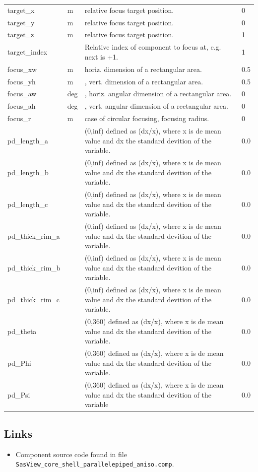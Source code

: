 \begin{longtable}{p{}p{}p{}p{}}
target\_x & m & relative focus target position. & 0 \\
target\_y & m & relative focus target position. & 0 \\
target\_z & m & relative focus target position. & 1 \\
target\_index &   & Relative index of component to focus at, e.g. next is +1. & 1 \\
focus\_xw & m & horiz. dimension of a rectangular area. & 0.5 \\
focus\_yh & m & , vert. dimension of a rectangular area. & 0.5 \\
focus\_aw & deg & , horiz. angular dimension of a rectangular area. & 0 \\
focus\_ah & deg & , vert. angular dimension of a rectangular area. & 0 \\
focus\_r & m & case of circular focusing, focusing radius. & 0 \\
pd\_length\_a &  & (0,inf) defined as (dx/x), where x is de mean value and dx the standard devition of the variable. & 0.0 \\
pd\_length\_b &  & (0,inf) defined as (dx/x), where x is de mean value and dx the standard devition of the variable. & 0.0 \\
pd\_length\_c &  & (0,inf) defined as (dx/x), where x is de mean value and dx the standard devition of the variable. & 0.0 \\
pd\_thick\_rim\_a &  & (0,inf) defined as (dx/x), where x is de mean value and dx the standard devition of the variable. & 0.0 \\
pd\_thick\_rim\_b &  & (0,inf) defined as (dx/x), where x is de mean value and dx the standard devition of the variable. & 0.0 \\
pd\_thick\_rim\_c &  & (0,inf) defined as (dx/x), where x is de mean value and dx the standard devition of the variable. & 0.0 \\
pd\_theta &  & (0,360) defined as (dx/x), where x is de mean value and dx the standard devition of the variable. & 0.0 \\
pd\_Phi &  & (0,360) defined as (dx/x), where x is de mean value and dx the standard devition of the variable. & 0.0 \\
pd\_Psi &  & (0,360) defined as (dx/x), where x is de mean value and dx the standard devition of the variable & 0.0 \\
\bottomrule
\end{longtable}

\subsection*{Links}
\begin{itemize}
  \item Component source code found in file \texttt{SasView\_core\_shell\_parallelepiped\_aniso.comp}.
\end{itemize}
